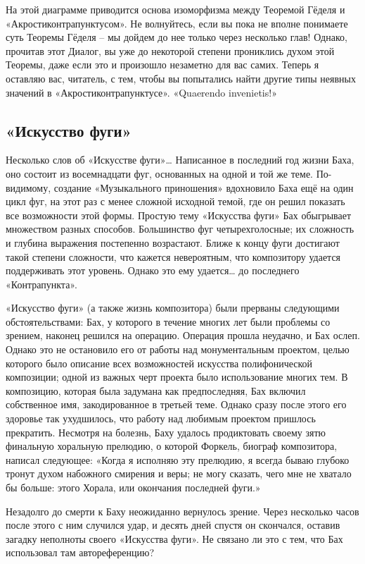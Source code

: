 \documentclass[../main.tex]{subfiles}
\begin{document}
На этой диаграмме приводится основа изоморфизма между Теоремой Гёделя и «Акростиконтрапунктусом». Не волнуйтесь, если вы пока не вполне понимаете суть Теоремы Гёделя \--- мы дойдем до нее только через несколько глав! Однако, прочитав этот Диалог, вы уже до некоторой степени прониклись духом этой Теоремы, даже если это и произошло незаметно для вас самих. Теперь я оставляю вас, читатель, с тем, чтобы вы попытались найти другие типы неявных значений в «Акростиконтрапунктусе». «Quaerendo invenietis!»


\subsection{«Искусство фуги»}

Несколько слов об «Искусстве фуги»\ldots{} Написанное в последний год жизни Баха, оно состоит из восемнадцати фуг, основанных на одной и той же теме. По-видимому, создание «Музыкального приношения» вдохновило Баха ещё на один цикл фуг, на этот раз с менее сложной исходной темой, где он решил показать все возможности этой формы. Простую тему «Искусства фуги» Бах обыгрывает множеством разных способов. Большинство фуг четырехголосные; их сложность и глубина выражения постепенно возрастают. Ближе к концу фуги достигают такой степени сложности, что кажется невероятным, что композитору удается поддерживать этот уровень. Однако это ему удается\ldots{} до последнего «Контрапункта».

«Искусство фуги» (а также жизнь композитора) были прерваны следующими обстоятельствами: Бах, у которого в течение многих лет были проблемы со зрением, наконец решился на операцию. Операция прошла неудачно, и Бах ослеп. Однако это не остановило его от работы над монументальным проектом, целью которого было описание всех возможностей искусства полифонической композиции; одной из важных черт проекта было использование многих тем. В композицию, которая была задумана как предпоследняя, Бах включил собственное имя, закодированное в третьей теме. Однако сразу после этого его здоровье так ухудшилось, что работу над любимым проектом пришлось прекратить. Несмотря на болезнь, Баху удалось продиктовать своему зятю финальную хоральную прелюдию, о которой Форкель, биограф композитора, написал следующее: «Когда я исполняю эту прелюдию, я всегда бываю глубоко тронут духом набожного смирения и веры; не могу сказать, чего мне не хватало бы больше: этого Хорала, или окончания последней фуги.»

Незадолго до смерти к Баху неожиданно вернулось зрение. Через несколько часов после этого с ним случился удар, и десять дней спустя он скончался, оставив загадку неполноты своего «Искусства фуги». Не связано ли это с тем, что Бах использовал там автореференцию?
\end{document}
